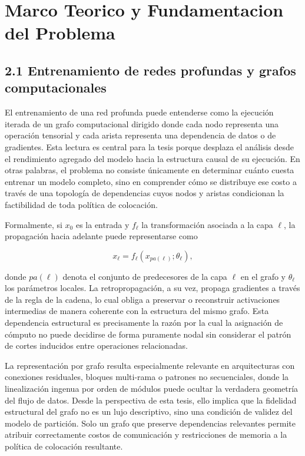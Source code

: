 \chapter{Marco Teorico y Fundamentacion del Problema}

\section{2.1 Entrenamiento de redes profundas y grafos computacionales}
El entrenamiento de una red profunda puede entenderse como la ejecución iterada de un grafo computacional dirigido donde cada nodo representa una operación tensorial y cada arista representa una dependencia de datos o de gradientes. Esta lectura es central para la tesis porque desplaza el análisis desde el rendimiento agregado del modelo hacia la estructura causal de su ejecución. En otras palabras, el problema no consiste únicamente en determinar cuánto cuesta entrenar un modelo completo, sino en comprender cómo se distribuye ese costo a través de una topología de dependencias cuyos nodos y aristas condicionan la factibilidad de toda política de colocación.

Formalmente, si $x_0$ es la entrada y $f_\ell$ la transformación asociada a la capa $\ell$, la propagación hacia adelante puede representarse como

$$
x_\ell = f_\ell(x_{pa(\ell)}; \theta_\ell),
$$

donde $pa(\ell)$ denota el conjunto de predecesores de la capa $\ell$ en el grafo y $\theta_\ell$ los parámetros locales. La retropropagación, a su vez, propaga gradientes a través de la regla de la cadena, lo cual obliga a preservar o reconstruir activaciones intermedias de manera coherente con la estructura del mismo grafo. Esta dependencia estructural es precisamente la razón por la cual la asignación de cómputo no puede decidirse de forma puramente nodal sin considerar el patrón de cortes inducidos entre operaciones relacionadas.

La representación por grafo resulta especialmente relevante en arquitecturas con conexiones residuales, bloques multi-rama o patrones no secuenciales, donde la linealización ingenua por orden de módulos puede ocultar la verdadera geometría del flujo de datos. Desde la perspectiva de esta tesis, ello implica que la fidelidad estructural del grafo no es un lujo descriptivo, sino una condición de validez del modelo de partición. Solo un grafo que preserve dependencias relevantes permite atribuir correctamente costos de comunicación y restricciones de memoria a la política de colocación resultante.

